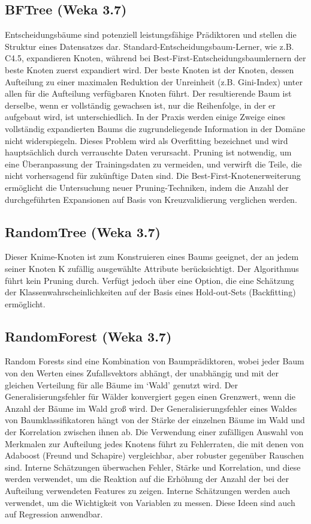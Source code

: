 \documentclass[12pt,					%
							 oneside,			%
							 a4paper,			%
							 halfparskip,		%
							 liststotoc,			%
							 bibtotoc,			%
							 fleqn,				%
							 pointlessnumbers]	%
							 {scrreprt}
\begin{document}
		\subsection{BFTree (Weka 3.7)}
			Entscheidungsbäume sind potenziell leistungsfähige Prädiktoren und stellen die Struktur eines Datensatzes dar. Standard-Entscheidungsbaum-Lerner, wie z.B. C4.5, expandieren Knoten, während bei Best-First-Entscheidungsbaumlernern der \glqq{}beste\grqq{} Knoten zuerst expandiert wird. Der \glqq{}beste\grqq{} Knoten ist der Knoten, dessen Aufteilung zu einer maximalen Reduktion der Unreinheit (z.B. Gini-Index) unter allen für die Aufteilung verfügbaren Knoten führt. Der resultierende Baum ist derselbe, wenn er vollständig gewachsen ist, nur die Reihenfolge, in der er aufgebaut wird, ist unterschiedlich. In der Praxis werden einige Zweige eines vollständig expandierten Baums die zugrundeliegende Information in der Domäne nicht widerspiegeln. Dieses Problem wird als Overfitting bezeichnet und wird hauptsächlich durch verrauschte Daten verursacht. Pruning ist notwendig, um eine Überanpassung der Trainingsdaten zu vermeiden, und verwirft die Teile, die nicht vorhersagend für zukünftige Daten sind. Die Best-First-Knotenerweiterung ermöglicht die Untersuchung neuer Pruning-Techniken, indem die Anzahl der durchgeführten Expansionen auf Basis von Kreuzvalidierung verglichen werden.\cite{Shi07}
			
			
		\subsection{RandomTree (Weka 3.7)}			
			Dieser Knime-Knoten ist zum Konstruieren eines Baums geeignet, der an jedem seiner Knoten K zufällig ausgewählte Attribute berücksichtigt. Der Algorithmus führt kein Pruning durch. Verfügt jedoch über eine Option, die eine Schätzung der Klassenwahrscheinlichkeiten auf der Basis eines Hold-out-Sets (Backfitting) ermöglicht.
			
		\subsection{RandomForest (Weka 3.7)}			
			Random Forests sind eine Kombination von Baumprädiktoren, wobei jeder Baum von den Werten eines Zufallsvektors abhängt, der unabhängig und mit der gleichen Verteilung für alle Bäume im `Wald' genutzt wird. Der Generalisierungsfehler für Wälder konvergiert gegen einen Grenzwert, wenn die Anzahl der Bäume im Wald groß wird. Der Generalisierungsfehler eines Waldes von Baumklassifikatoren hängt von der Stärke der einzelnen Bäume im Wald und der Korrelation zwischen ihnen ab. Die Verwendung einer zufälligen Auswahl von Merkmalen zur Aufteilung jedes Knotens führt zu Fehlerraten, die mit denen von Adaboost (Freund und Schapire) vergleichbar, aber robuster gegenüber Rauschen sind. Interne Schätzungen überwachen Fehler, Stärke und Korrelation, und diese werden verwendet, um die Reaktion auf die Erhöhung der Anzahl der bei der Aufteilung verwendeten Features zu zeigen. Interne Schätzungen werden auch verwendet, um die Wichtigkeit von Variablen zu messen. Diese Ideen sind auch auf Regression anwendbar. \cite{Breiman2001}		
			
\end{document}
